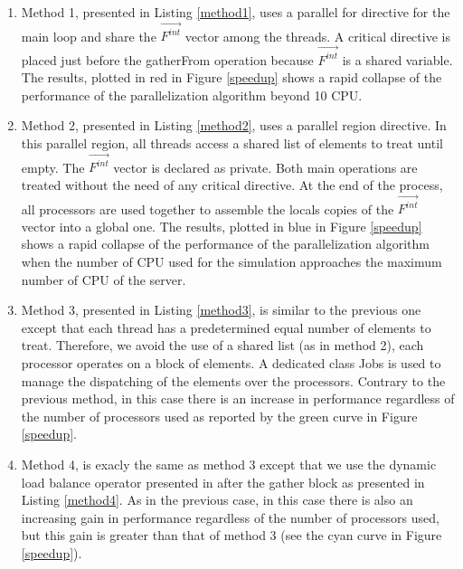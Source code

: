 \begin{enumerate}
\item Method 1, presented in Listing \ref{method1}, uses a parallel for directive for the main loop and share the $\overrightarrow{F^{int}}$ vector among the threads. A critical directive is placed just before the gatherFrom operation because $\overrightarrow{F^{int}}$ is a shared variable. The results, plotted in red in Figure \ref{speedup} shows a rapid collapse of the performance of the parallelization algorithm beyond 10 CPU.

\item Method 2, presented in Listing \ref{method2}, uses a parallel region directive. In this parallel region, all threads access a shared list of elements to treat until empty. The $\overrightarrow{F^{int}}$ vector is declared as private. Both main operations are treated without the need of any critical directive. At the end of the process, all processors are used together to assemble the locals copies of the $\overrightarrow{F^{int}}$ vector into a global one. The results, plotted in blue in Figure \ref{speedup} shows a rapid collapse of the performance of the parallelization algorithm when the number of CPU used for the simulation approaches the maximum number of CPU of the server.

\item Method 3, presented in Listing \ref{method3}, is similar to the previous one except that each thread has a predetermined equal number of elements to treat. Therefore, we avoid the use of a shared list (as in method 2), each processor operates on a block of elements. A dedicated class Jobs is used to manage the dispatching of the elements over the processors. Contrary to the previous method, in this case there is an increase in performance regardless of the number of processors used as reported by the green curve in Figure \ref{speedup}.

\item Method 4, is exacly the same as method 3 except that we use the dynamic load balance operator presented in \cite{Pantale:2005} after the gather block as presented in Listing \ref{method4}. As in the previous case, in this case there is also an increasing gain in performance regardless of the number of processors used, but this gain is greater than that of method 3 (see the cyan curve in Figure \ref{speedup}).

\end{enumerate}

